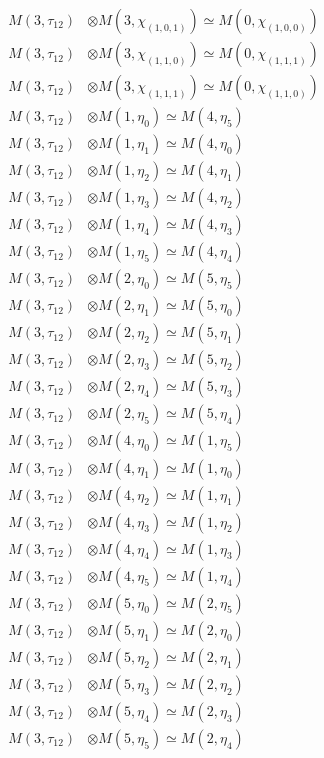 \begin{align*}
M(3,\tau_{12}) &\otimes M(3,\chi_{(1,0,1)}) \simeq M(0,\chi_{(1,0,0)}) \\
M(3,\tau_{12}) &\otimes M(3,\chi_{(1,1,0)}) \simeq M(0,\chi_{(1,1,1)}) \\
M(3,\tau_{12}) &\otimes M(3,\chi_{(1,1,1)}) \simeq M(0,\chi_{(1,1,0)}) \\
M(3,\tau_{12}) &\otimes M(1,\eta_{0}) \simeq M(4,\eta_{5}) \\
M(3,\tau_{12}) &\otimes M(1,\eta_{1}) \simeq M(4,\eta_{0}) \\
M(3,\tau_{12}) &\otimes M(1,\eta_{2}) \simeq M(4,\eta_{1}) \\
M(3,\tau_{12}) &\otimes M(1,\eta_{3}) \simeq M(4,\eta_{2}) \\
M(3,\tau_{12}) &\otimes M(1,\eta_{4}) \simeq M(4,\eta_{3}) \\
M(3,\tau_{12}) &\otimes M(1,\eta_{5}) \simeq M(4,\eta_{4}) \\
M(3,\tau_{12}) &\otimes M(2,\eta_{0}) \simeq M(5,\eta_{5}) \\
M(3,\tau_{12}) &\otimes M(2,\eta_{1}) \simeq M(5,\eta_{0}) \\
M(3,\tau_{12}) &\otimes M(2,\eta_{2}) \simeq M(5,\eta_{1}) \\
M(3,\tau_{12}) &\otimes M(2,\eta_{3}) \simeq M(5,\eta_{2}) \\
M(3,\tau_{12}) &\otimes M(2,\eta_{4}) \simeq M(5,\eta_{3}) \\
M(3,\tau_{12}) &\otimes M(2,\eta_{5}) \simeq M(5,\eta_{4}) \\
M(3,\tau_{12}) &\otimes M(4,\eta_{0}) \simeq M(1,\eta_{5}) \\
M(3,\tau_{12}) &\otimes M(4,\eta_{1}) \simeq M(1,\eta_{0}) \\
M(3,\tau_{12}) &\otimes M(4,\eta_{2}) \simeq M(1,\eta_{1}) \\
M(3,\tau_{12}) &\otimes M(4,\eta_{3}) \simeq M(1,\eta_{2}) \\
M(3,\tau_{12}) &\otimes M(4,\eta_{4}) \simeq M(1,\eta_{3}) \\
M(3,\tau_{12}) &\otimes M(4,\eta_{5}) \simeq M(1,\eta_{4}) \\
M(3,\tau_{12}) &\otimes M(5,\eta_{0}) \simeq M(2,\eta_{5}) \\
M(3,\tau_{12}) &\otimes M(5,\eta_{1}) \simeq M(2,\eta_{0}) \\
M(3,\tau_{12}) &\otimes M(5,\eta_{2}) \simeq M(2,\eta_{1}) \\
M(3,\tau_{12}) &\otimes M(5,\eta_{3}) \simeq M(2,\eta_{2}) \\
M(3,\tau_{12}) &\otimes M(5,\eta_{4}) \simeq M(2,\eta_{3}) \\
M(3,\tau_{12}) &\otimes M(5,\eta_{5}) \simeq M(2,\eta_{4}) \\
\end{align*}

